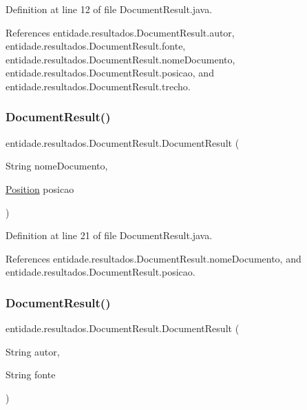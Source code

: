 Definition at line 12 of file Document\+Result.\+java.



References entidade.\+resultados.\+Document\+Result.\+autor, entidade.\+resultados.\+Document\+Result.\+fonte, entidade.\+resultados.\+Document\+Result.\+nome\+Documento, entidade.\+resultados.\+Document\+Result.\+posicao, and entidade.\+resultados.\+Document\+Result.\+trecho.

\hypertarget{classentidade_1_1resultados_1_1DocumentResult_a035ccff5ed35ef1cce97ea9107d6f78e}{}\label{classentidade_1_1resultados_1_1DocumentResult_a035ccff5ed35ef1cce97ea9107d6f78e} 
\subsubsection{\texorpdfstring{Document\+Result()}{DocumentResult()}\hspace{0.1cm}{\footnotesize\ttfamily [2/3]}}
{\footnotesize\ttfamily entidade.\+resultados.\+Document\+Result.\+Document\+Result (\begin{DoxyParamCaption}\item[{String}]{nome\+Documento,  }\item[{\hyperlink{classentidade_1_1Position}{Position}}]{posicao }\end{DoxyParamCaption})}



Definition at line 21 of file Document\+Result.\+java.



References entidade.\+resultados.\+Document\+Result.\+nome\+Documento, and entidade.\+resultados.\+Document\+Result.\+posicao.

\hypertarget{classentidade_1_1resultados_1_1DocumentResult_ad45c2937e41ef220c2008e631ffd9469}{}\label{classentidade_1_1resultados_1_1DocumentResult_ad45c2937e41ef220c2008e631ffd9469} 
\subsubsection{\texorpdfstring{Document\+Result()}{DocumentResult()}\hspace{0.1cm}{\footnotesize\ttfamily [3/3]}}
{\footnotesize\ttfamily entidade.\+resultados.\+Document\+Result.\+Document\+Result (\begin{DoxyParamCaption}\item[{String}]{autor,  }\item[{String}]{fonte }\end{DoxyParamCaption})}



